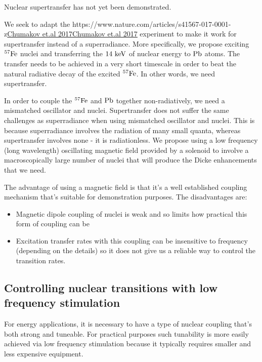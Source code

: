 \documentclass[
]{article}
\let\oldhref\href
\renewcommand{\href}[2]{\ifx#1\urlprefix\oldhref{#1}{#2}\else\uline{\oldhref{#1}{#2}}\fi}
\renewcommand{\[}{\begin{equation}}
\renewcommand{\]}{\end{equation}}
\providecommand{\tightlist}{%
  \setlength{\itemsep}{0pt}\setlength{\parskip}{0pt}}
\begin{document}
Nuclear supertransfer has not yet been demonstrated.

We seek to adapt the
\href{https://www.nature.com/articles/s41567-017-0001-z}{Chumakov et.al
2017} experiment to make it work for supertransfer instead of a
superradiance. More specifically, we propose exciting \(\rm ^{57}Fe\)
nuclei and transferring the \(14 \ \rm keV\) of nuclear energy to
\(\rm Pb\) atoms. The transfer needs to be achieved in a very short
timescale in order to beat the natural radiative decay of the excited
\(\rm ^{57}Fe\). In other words, we need supertransfer.

In order to couple the \(\rm ^{57}Fe\) and \(\rm Pb\) together
non-radiatively, we need a mismatched oscillator and nuclei.
Supertransfer does not suffer the same challenges as superradiance when
using mismatched oscillator and nuclei. This is because superradiance
involves the radiation of many small quanta, whereas supertransfer
involves none - it is radiationless. We propose using a low frequency
(long wavelength) oscillating magnetic field provided by a solenoid to
involve a macroscopically large number of nuclei that will produce the
Dicke enhancements that we need.

The advantage of using a magnetic field is that it's a well established
coupling mechanism that's suitable for demonstration purposes. The
disadvantages are:

\begin{itemize}
\tightlist
\item
  Magnetic dipole coupling of nuclei is weak and so limits how practical
  this form of coupling can be
\item
  Excitation transfer rates with this coupling can be insensitive to
  frequency (depending on the details) so it does not give us a reliable
  way to control the transition rates.
\end{itemize}

\subsection{Controlling nuclear transitions with low frequency
stimulation}\label{controlling-nuclear-transitions-with-low-frequency-stimulation}

For energy applications, it is necessary to have a type of nuclear
coupling that's both strong and tuneable. For practical purposes such
tunability is more easily achieved via low frequency stimulation because
it typically requires smaller and less expensive equipment.
\end{document}
